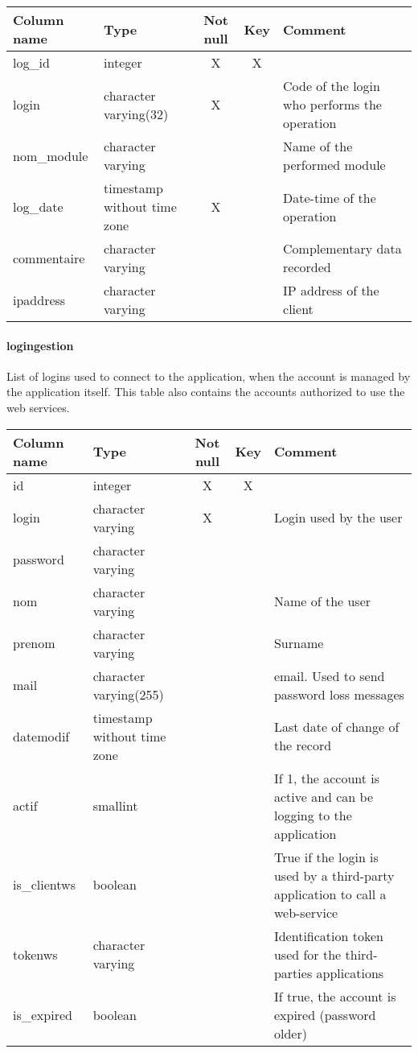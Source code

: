 \begin{tabular}{|l| p{2cm}|c|c| p{5cm}|}
\hline
Column name & Type & Not null & Key & Comment \\
\hline
log\_id & integer & X & X & \\
login & character varying(32) & X &  & Code of the login who performs the operation\\
nom\_module & character varying &  &  & Name of the performed module\\
log\_date & timestamp without time zone & X &  & Date-time of the operation\\
commentaire & character varying &  &  & Complementary data recorded\\
ipaddress & character varying &  &  & IP address of the client\\
\hline
\end{tabular}
\paragraph{logingestion}
List of logins used to connect to the application, when the account is managed by the application itself. This table also contains the accounts authorized to use the web services.

\begin{tabular}{|l| p{2cm}|c|c| p{5cm}|}
\hline
Column name & Type & Not null & Key & Comment \\
\hline
id & integer & X & X & \\
login & character varying & X &  & Login used by the user\\
password & character varying &  &  & \\
nom & character varying &  &  & Name of the user\\
prenom & character varying &  &  & Surname\\
mail & character varying(255) &  &  & email. Used to send password loss messages\\
datemodif & timestamp without time zone &  &  & Last date of change of the record\\
actif & smallint &  &  & If 1, the account is active and can be logging to the application\\
is\_clientws & boolean &  &  & True if the login is used by a third-party application to call a web-service\\
tokenws & character varying &  &  & Identification token used for the third-parties applications\\
is\_expired & boolean &  &  & If true, the account is expired (password older)\\
\hline
\end{tabular}
